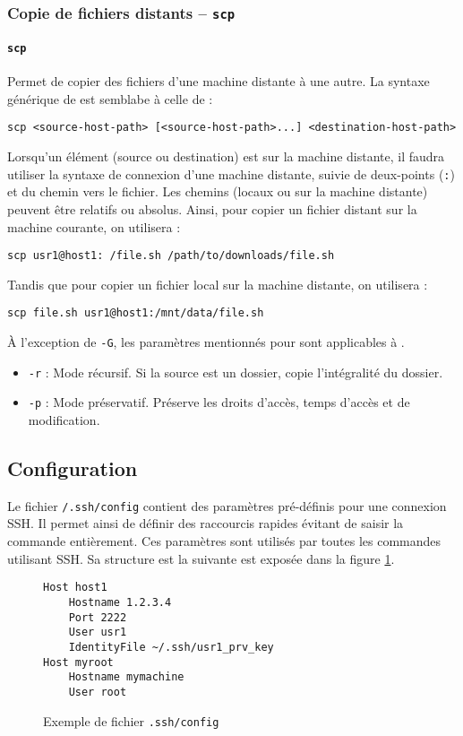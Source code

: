 \subsubsection{Copie de fichiers distants -- \texttt{scp}}

\paragraph{\texttt{scp}} 
Permet de copier des fichiers d'une machine distante à une autre.
La syntaxe générique de  est semblabe à celle de  :
\begin{nscenter}
    \texttt{scp <source-host-path> [<source-host-path>...] <destination-host-path>}
\end{nscenter}
Lorsqu'un élément (source ou destination) est sur la machine distante, il faudra utiliser la syntaxe de connexion d'une machine distante, suivie de deux-points (\texttt{:}) et du chemin vers le fichier. Les chemins (locaux ou sur la machine distante) peuvent être relatifs ou absolus.
Ainsi, pour copier un fichier distant sur la machine courante, on utilisera :  
\begin{nscenter}
    \texttt{scp usr1@host1:~/file.sh /path/to/downloads/file.sh}
\end{nscenter}
Tandis que pour copier un fichier local sur la machine distante, on utilisera :  
\begin{nscenter}
    \texttt{scp file.sh usr1@host1:/mnt/data/file.sh}
\end{nscenter}


 À l'exception de \texttt{-G}, les paramètres mentionnés pour  sont applicables à .
\begin{itemize}
    \item \texttt{-r} : Mode récursif. Si la source est un dossier, copie l'intégralité du dossier.
    \item \texttt{-p} : Mode préservatif. Préserve les droits d'accès, temps d'accès et de modification.
\end{itemize}

\subsection{Configuration}

Le fichier \texttt{\tilde/.ssh/config} contient des paramètres pré-définis pour une connexion SSH. Il permet ainsi de définir des raccourcis rapides évitant de saisir la commande entièrement. Ces paramètres sont utilisés par toutes les commandes utilisant SSH. \newline
Sa structure est la suivante est exposée dans la figure \ref{fig:sshconf}.
\begin{figure}[h!]
\centering
\begin{verbatim}
Host host1
    Hostname 1.2.3.4
    Port 2222
    User usr1
    IdentityFile ~/.ssh/usr1_prv_key
Host myroot
    Hostname mymachine
    User root
\end{verbatim}
\vspace{-\baselineskip}\caption{Exemple de fichier \texttt{.ssh/config}} \label{fig:sshconf}
\end{figure}

